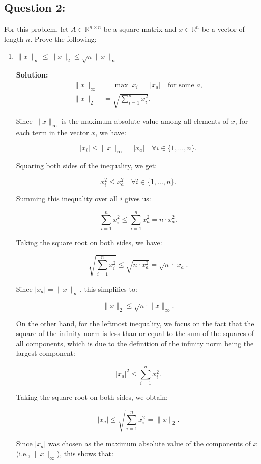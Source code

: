 \documentclass[11pt,onecolumn]{article}
\newcommand{\R}{\mathbb{R}}
\begin{document}
\subsection*{Question 2:}
For this problem, let $A\in \R^{n \times n}$ be a square matrix and $x\in\R^n$ be a vector of length $n.$ Prove the following:
\begin{enumerate}
\item $\|x\|_{\infty} \leq \|x\|_2 \leq \sqrt{n}\|x\|_{\infty}$

\textbf{Solution:}
\begin{align*}
\|x\|_{\infty} &= \max |x_i| = |x_a| \quad \text{for some } a, \\
\|x\|_{2} &= \sqrt{\sum_{i=1}^n x_i^2}.
\end{align*}

Since $\|x\|_{\infty}$ is the maximum absolute value among all elements of $x$, for each term in the vector $x$, we have:

\[
|x_i| \leq \|x\|_{\infty} = |x_a| \quad \forall i \in \{1, \ldots, n\}.
\]

Squaring both sides of the inequality, we get:

\[
x_i^2 \leq x_a^2 \quad \forall i \in \{1, \ldots, n\}.
\]

Summing this inequality over all $i$ gives us:

\[
\sum_{i=1}^n x_i^2 \leq \sum_{i=1}^n x_a^2 = n \cdot x_a^2.
\]

Taking the square root on both sides, we have:

\[
\sqrt{\sum_{i=1}^n x_i^2} \leq \sqrt{n \cdot x_a^2} = \sqrt{n} \cdot |x_a|.
\]

Since \( |x_a| = \|x\|_{\infty} \), this simplifies to:

\[
\|x\|_{2} \leq \sqrt{n} \cdot \|x\|_{\infty}.
\]

On the other hand, for the leftmost inequality, we focus on the fact that the square of the infinity norm is less than or equal to the sum of the squares of all components, which is due to the definition of the infinity norm being the largest component:

\[
|x_a|^2 \leq \sum_{i=1}^n x_i^2.
\]

Taking the square root on both sides, we obtain:

\[
|x_a| \leq \sqrt{\sum_{i=1}^n x_i^2} = \|x\|_{2}.
\]

Since \( |x_a| \) was chosen as the maximum absolute value of the components of \( x \) (i.e., \( \|x\|_{\infty} \)), this shows that:


\end{enumerate}
\end{document}
